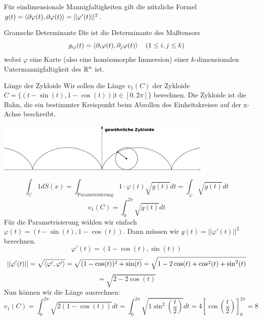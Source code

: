 Für eindimensionale Mannigfaltigkeiten gilt die nützliche Formel $g(t)=\braket{\partial \varphi(t), \partial \varphi(t)}=||\varphi ' (t)||^2$.
\begin{Def}{Gramsche Determinante}
    Die  ist die Determinante des Maßtensors
    $$g_{ij}(t)=\braket{\partial_i \varphi(t), \partial_j \varphi(t)} \quad (1\leq i,j\leq k)$$
    wobei $\varphi$ eine Karte (also eine homöomorphe Immersion) einer $k$-dimensionalen Untermannigfaltigkeit des $\mathbb{R}^n$ ist. 
\end{Def}
\begin{Beispiel}{Länge der Zykloide}
    Wir sollen die Länge $v_1(C)$ der Zykloide $C=\{ (t-\sin(t), 1-\cos(t)) | t\in [0,2\pi]\}$ berechnen. Die Zykloide ist die Bahn, die ein bestimmter Kreispunkt beim Abrollen des Einheitskreises auf der x-Achse beschreibt.
   \begin{center}
    \includegraphics[width=0.8\textwidth]{Dateien/Zykloide.pdf}
\end{center}
$$\int_C 1 dS(x)=\int_{\text{Parametrisierung}} 1\cdot \varphi(t)\sqrt{g(t)}dt=\int_\varphi \sqrt{g(t)}dt$$
$$v_1(C)=\int_0^{2\pi} \sqrt{g(t)}dt$$
Für die Parametrisierung wählen wir einfach $\varphi(t)=(t-\sin(t),1-\cos(t))$. Dann müssen wir $g(t)=||\varphi'(t)||^2$ berechnen. 
$$\varphi'(t)=(1-\cos(t), \sin(t))$$
$$||\varphi'(t)||=\sqrt{\braket{\varphi ', \varphi '}}=\sqrt{(1-\cos(t))^2+\sin(t)}=\sqrt{1-2\cos(t)+\cos^2(t)+\sin^2(t)}$$
$$=\sqrt{2-2\cos(t)}$$
Nun können wir die Länge ausrechnen:
$$v_1(C)=\int_0^{2\pi} \sqrt{2(1-\cos(t))}dt=\int_0^{2\pi} \sqrt{1\sin^2(\frac{t}{2})}dt=4[\cos(\frac{t}{2})]^{2\pi}_0=8$$
\end{Beispiel}
\newpage
